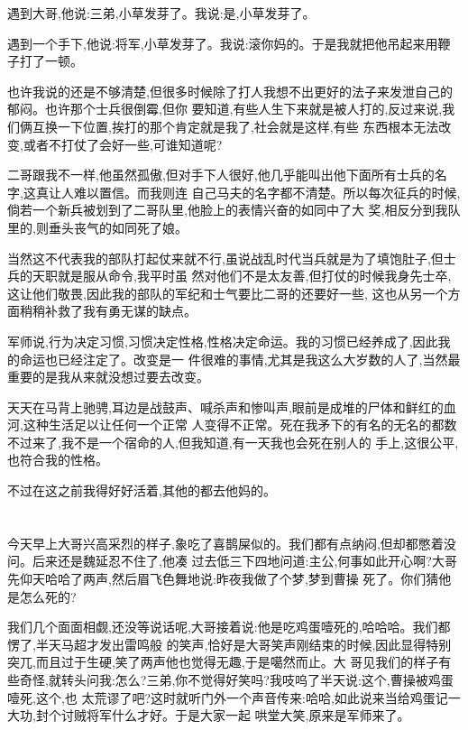 ﻿\documentclass[12pt,twocolumn]{article}
\begin{document}
遇到大哥,他说:三弟,小草发芽了。我说:是,小草发芽了。

遇到一个手下,他说:将军,小草发芽了。我说:滚你妈的。于是我就把他吊起来用鞭子打了一顿。

也许我说的还是不够清楚,但很多时候除了打人我想不出更好的法子来发泄自己的郁闷。也许那个士兵很倒霉,但你
要知道,有些人生下来就是被人打的,反过来说,我们俩互换一下位置,挨打的那个肯定就是我了,社会就是这样,有些
东西根本无法改变,或者不打仗了会好一些,可谁知道呢?

二哥跟我不一样,他虽然孤傲,但对手下人很好,他几乎能叫出他下面所有士兵的名字,这真让人难以置信。而我则连
自己马夫的名字都不清楚。所以每次征兵的时候,倘若一个新兵被划到了二哥队里,他脸上的表情兴奋的如同中了大
奖,相反分到我队里的,则垂头丧气的如同死了娘。

当然这不代表我的部队打起仗来就不行,虽说战乱时代当兵就是为了填饱肚子,但士兵的天职就是服从命令,我平时虽
然对他们不是太友善,但打仗的时候我身先士卒,这让他们敬畏,因此我的部队的军纪和士气要比二哥的还要好一些,
这也从另一个方面稍稍补救了我有勇无谋的缺点。

军师说,行为决定习惯,习惯决定性格,性格决定命运。我的习惯已经养成了,因此我的命运也已经注定了。改变是一
件很难的事情,尤其是我这么大岁数的人了,当然最重要的是我从来就没想过要去改变。

天天在马背上驰骋,耳边是战鼓声、喊杀声和惨叫声,眼前是成堆的尸体和鲜红的血河,这种生活足以让任何一个正常
人变得不正常。死在我矛下的有名的无名的都数不过来了,我不是一个宿命的人,但我知道,有一天我也会死在别人的
手上,这很公平,也符合我的性格。

不过在这之前我得好好活着,其他的都去他妈的。

\section{}

今天早上大哥兴高采烈的样子,象吃了喜鹊屎似的。我们都有点纳闷,但却都憋着没问。后来还是魏延忍不住了,他凑
过去低三下四地问道:主公,何事如此开心啊?大哥先仰天哈哈了两声,然后眉飞色舞地说:昨夜我做了个梦,梦到曹操
死了。你们猜他是怎么死的?

我们几个面面相觑,还没等说话呢,大哥接着说:他是吃鸡蛋噎死的,哈哈哈\dldots 。我们都愣了,半天马超才发出雷鸣般
的笑声,恰好是大哥笑声刚结束的时候,因此显得特别突兀,而且过于生硬,笑了两声他也觉得无趣,于是噶然而止。大
哥见我们的样子有些奇怪,就转头问我:怎么?三弟,你不觉得好笑吗?我吱呜了半天说:这个,曹操被鸡蛋噎死,这个,也
太荒谬了吧?这时就听门外一个声音传来:哈哈,如此说来当给鸡蛋记一大功,封个讨贼将军什么才好。于是大家一起
哄堂大笑,原来是军师来了。
\end{document}
